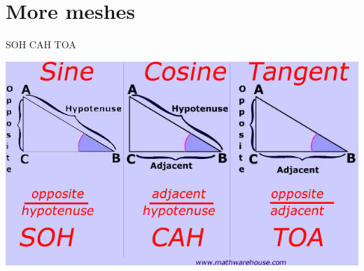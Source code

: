 \part{More meshes}
\frame{\partpage}

\begin{frame}{SOH CAH TOA}
	\begin{center}
		\includegraphics[width=\textwidth]{sohcahtoa}
	\end{center}
\end{frame}

